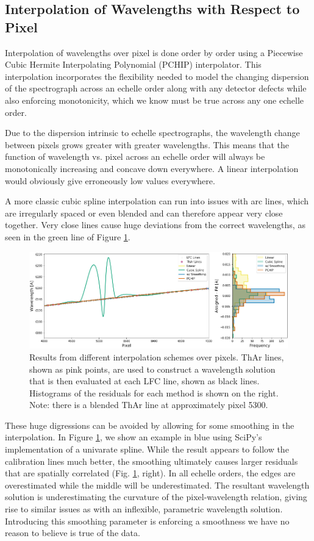 \documentclass[12pt, onecolumn]{aastex63}
\begin{document}
\subsection{Interpolation of Wavelengths with Respect to Pixel}
Interpolation of wavelengths over pixel  is done order by order using a Piecewise Cubic Hermite Interpolating Polynomial (PCHIP) interpolator.  This interpolation incorporates the flexibility needed to model the changing dispersion of the spectrograph across an echelle order along with any detector defects while also enforcing monotonicity, which we know must be true across any one echelle order.

Due to the dispersion intrinsic to echelle spectrographs, the wavelength change between pixels grows greater with greater wavelengths.  This means that the function of wavelength vs. pixel across an echelle order will always be monotonically increasing and concave down everywhere.  A linear interpolation would obviously give erroneously low values everywhere.

A more classic cubic spline interpolation can run into issues with arc lines, which are irregularly spaced or even blended and can therefore appear very close together.  Very close lines cause huge deviations from the correct wavelengths, as seen in the green line of Figure \ref{fig:xinterp}.

\begin{figure}[h]
\centering
\includegraphics[width=\textwidth]{Figures/intpx_tests.png}
\caption{Results from different interpolation schemes over pixels.  ThAr lines, shown as pink points, are used to construct a wavelength solution that is then evaluated at each LFC line, shown as black lines.  Histograms of the residuals for each method is shown on the right.  Note: there is a blended ThAr line at approximately pixel 5300.}
\label{fig:xinterp}
\end{figure} 

These huge digressions can be avoided by allowing for some smoothing in the interpolation.  In Figure \ref{fig:xinterp}, we show an example in blue using SciPy's implementation of a univarate spline.  While the result appears to follow the calibration lines much better, the smoothing ultimately causes larger residuals that are spatially correlated (Fig. \ref{fig:xinterp}, right).  In all echelle orders, the edges are overestimated while the middle will be underestimated.  The resultant wavelength solution is underestimating the curvature of the pixel-wavelength relation, giving rise to similar issues as with an inflexible, parametric wavelength solution.  Introducing this smoothing parameter is enforcing a smoothness we have no reason to believe is true of the data.
\end{document}
